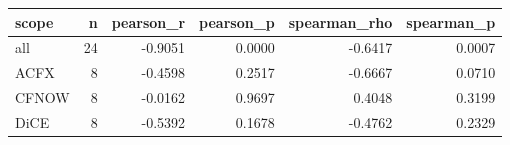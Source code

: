 \begin{tabular}{lrrrrr}
\toprule
scope &  n &  pearson\_r &  pearson\_p &  spearman\_rho &  spearman\_p \\
\midrule
  all & 24 &    -0.9051 &     0.0000 &       -0.6417 &      0.0007 \\
 ACFX &  8 &    -0.4598 &     0.2517 &       -0.6667 &      0.0710 \\
CFNOW &  8 &    -0.0162 &     0.9697 &        0.4048 &      0.3199 \\
 DiCE &  8 &    -0.5392 &     0.1678 &       -0.4762 &      0.2329 \\
\bottomrule
\end{tabular}

